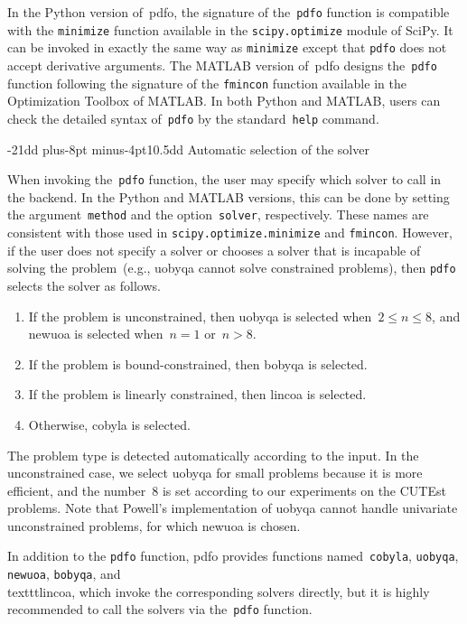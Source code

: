 \documentclass[smallextended]{svjour3}
\makeatletter
\def\subsection{\@startsection{subsection}{2}{\z@}%
    {-21dd plus-8pt minus-4pt}{10.5dd}
    {\normalsize\bfseries}}
\newcommand{\modified}[1]{#1}
\makeatother
\begin{document}
In the Python version of~\gls{pdfo}, the signature of the~\texttt{pdfo} function is compatible with the \texttt{minimize} function available in the \texttt{scipy.optimize} module of SciPy.
It can be invoked in exactly the same way as \texttt{minimize} except that \texttt{pdfo} does not accept derivative arguments.
The MATLAB version of~\gls{pdfo} designs the~\texttt{pdfo} function following the signature of the \texttt{fmincon} function available in the Optimization Toolbox of MATLAB.
In both Python and MATLAB, users can check the detailed syntax of~\texttt{pdfo} by the standard~\texttt{help} command.

\subsection{Automatic selection of the solver}
\label{subsec:solver-selection}

When invoking the~\texttt{pdfo} function, the user may specify which solver to call in the backend.
\modified{%
    In the Python and MATLAB versions, this can be done by setting the argument~\texttt{method} and the option~\texttt{solver}, respectively.
    These names are consistent with those used in \texttt{scipy.optimize.minimize} and \texttt{fmincon}.}
However, if the user does not \modified{specify a solver} or chooses a solver that is incapable of solving the problem~(e.g., \gls{uobyqa} cannot solve constrained problems), then \texttt{pdfo} selects the solver as follows.
\begin{enumerate}
    \item If the problem is unconstrained, then \gls{uobyqa} is selected when~$2 \le n \le 8$, and \gls{newuoa} is selected when~$n = 1$ or~$n > 8$.
    \item If the problem is bound-constrained, then \gls{bobyqa} is selected.
    \item If the problem is linearly constrained, then \gls{lincoa} is selected.
    \item Otherwise, \gls{cobyla} is selected.
\end{enumerate}
The problem type is detected automatically according to the input.
In the unconstrained case, we select \gls{uobyqa} for small problems because it is more efficient, and the number~\num{8} is set according to our experiments on the CUTEst~\cite{Gould_Orban_Toint_2015} problems.
Note that Powell's implementation of \gls{uobyqa} cannot handle univariate unconstrained problems, for which \gls{newuoa} is chosen.

In addition to the \texttt{pdfo} function, \gls{pdfo} provides functions named~\texttt{cobyla}, \texttt{uobyqa}, \texttt{newuoa}, \texttt{bobyqa}, and~\\texttt{lincoa}, which invoke the corresponding solvers directly, but it is highly recommended to call the solvers via the~\texttt{pdfo} function.
\end{document}
